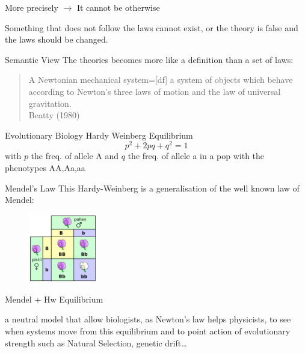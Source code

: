 \documentclass{beamer}
\begin{document}
\begin{frame}{More precisely}
$\rightarrow$ It cannot be otherwise

\vfill
Something that does not follow the laws cannot exist, or the theory is false and the laws should be changed.
\end{frame}

\begin{frame}{Semantic View}
	The theories becomes more like a definition than a set of laws:
	\vfill
	\begin{quote}
		A Newtonian mechanical system=[df] a system of objects which behave according to Newton's three laws of motion and the law of universal gravitation.\\
		Beatty (1980)
	\end{quote}
\end{frame}


\begin{frame}{Evolutionary Biology}
	Hardy Weinberg Equilibrium
	\begin{equation}
		p^2 + 2pq + q^2 = 1
		\label{eq:hw}
	\end{equation}
	with $p$ the freq. of allele A and $q$ the freq. of allele a in a pop with the phenotypes AA,Aa,aa
\end{frame}

\begin{frame}{Mendel's Law}
	This Hardy-Weinberg is a generalisation of the well known law of Mendel:
			\begin{figure}
				\includegraphics[width=3cm]{480px-Punnett_square_mendel_flowers.png}
			\end{figure}
	
\end{frame}
\begin{frame}
	\begin{center}
		Mendel + Hw Equilibrium
	\end{center}
	
	a neutral model that allow biologists, as Newton's law helps physicists, to see when systems move from this equilibrium and to point action of evolutionary strength such as Natural Selection, genetic drift\ldots 
\end{frame}
\end{document}
